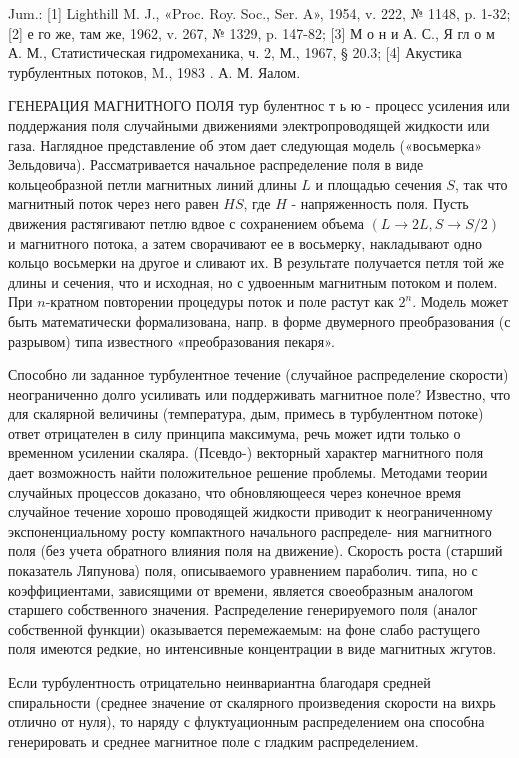 \documentclass[10pt]{article}
\begin{document}
Jum.: [1] Lighthill M. J., «Proc. Roy. Soc., Ser. A», 1954, v. 222, № 1148, p. 1-32; [2] е го же, там же, 1962, v. 267, № 1329, p. 147-82; [3] М о н и А. С., Я гл о м А. М., Статистическая гидромеханика, ч. 2, М., 1967, § 20.3; [4] Акустика турбулентных потоков, M., 1983 . А. М. Яалом.



ГЕНЕРАЦИЯ МАГНИТНОГО ПОЛЯ тур булентнос т ь ю - процесс усиления или поддержания поля случайными движениями электропроводящей жидкости или газа. Наглядное представление об этом дает следующая модель («восьмерка» Зельдовича). Рассматривается начальное распределение поля в виде кольцеобразной петли магнитных линий длины $L$ и площадью сечения $S$, так что магнитный поток через него равен $H S$, где $H$ - напряженность поля. Пусть движения растягивают петлю вдвое с сохранением объема $(L \rightarrow 2 L, S \rightarrow S / 2)$ и магнитного потока, а затем сворачивают ее в восьмерку, накладывают одно кольцо восьмерки на другое и сливают их. В результате получается петля той же длины и сечения, что и исходная, но с удвоенным магнитным потоком и полем. При $n$-кратном повторении процедуры поток и поле растут как $2^{n}$. Модель может быть математически формализована, напр. в форме двумерного преобразования (с разрывом) типа известного «преобразования пекаря».



Способно ли заданное турбулентное течение (случайное распределение скорости) неограниченно долго усиливать или поддерживать магнитное поле? Известно, что для скалярной величины (температура, дым, примесь в турбулентном потоке) ответ отрицателен в силу принципа максимума, речь может идти только о временном усилении скаляра. (Псевдо-) векторный характер магнитного поля дает возможность найти положительное решение проблемы. Методами теории случайных процессов доказано, что обновляющееся через конечное время случайное течение хорошо проводящей жидкости приводит к неограниченному экспоненциальному росту компактного начального распределе- ния магнитного поля (без учета обратного влияния поля на движение). Скорость роста (старший показатель Ляпунова) поля, описываемого уравнением параболич. типа, но с коэффициентами, зависящими от времени, является своеобразным аналогом старшего собственного значения. Распределение генерируемого поля (аналог собственной функции) оказывается перемежаемым: на фоне слабо растущего поля имеются редкие, но интенсивные концентрации в виде магнитных жгутов.



Если турбулентность отрицательно неинвариантна благодаря средней спиральности (среднее значение от скалярного произведения скорости на вихрь отлично от нуля), то наряду с флуктуационным распределением она способна генерировать и среднее магнитное поле с гладким распределением.
\end{document}
